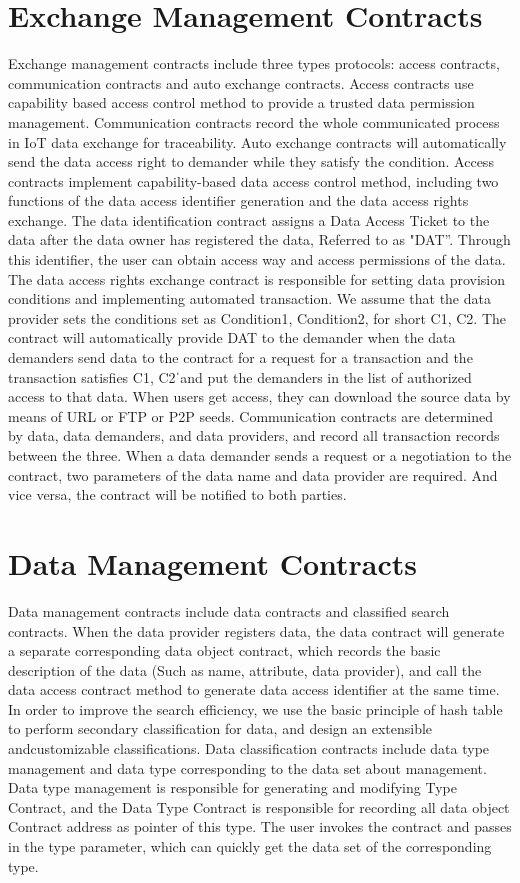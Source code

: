 \section{Exchange Management Contracts}
Exchange management contracts include three types
protocols: access contracts, communication contracts and
auto exchange contracts. Access contracts use capability
based access control method to provide a trusted data
permission management. Communication contracts record
the whole communicated process in IoT data exchange for
traceability. Auto exchange contracts will automatically send
the data access right to demander while they satisfy the
condition.
Access contracts implement capability-based data access
control method, including two functions of the data access
identifier generation and the data access rights exchange.
The data identification contract assigns a Data Access Ticket
to the data after the data owner has registered the data,
Referred to as "DAT”. Through this identifier, the user can
obtain access way and access permissions of the data. The
data access rights exchange contract is responsible for setting
data provision conditions and implementing automated
transaction. We assume that the data provider sets the
conditions set as Condition1, Condition2, for short C1, C2.
The contract will automatically provide DAT to the
demander when the data demanders send data to the contract
for a request for a transaction and the transaction satisfies C1, C2ˈand put the demanders in the list of authorized access to
that data. When users get access, they can download the
source data by means of URL or FTP or P2P seeds.
Communication contracts are determined by data, data
demanders, and data providers, and record all transaction
records between the three. When a data demander sends a
request or a negotiation to the contract, two parameters of the
data name and data provider are required. And vice versa, the
contract will be notified to both parties.
\section{Data Management Contracts}
Data management contracts include data contracts and
classified search contracts. When the data provider registers
data, the data contract will generate a separate corresponding
data object contract, which records the basic description of
the data (Such as name, attribute, data provider), and call the
data access contract method to generate data access identifier
at the same time. In order to improve the search efficiency,
we use the basic principle of hash table to perform secondary
classification for data, and design an extensible andcustomizable classifications. Data classification contracts
include data type management and data type corresponding
to the data set about management. Data type management is
responsible for generating and modifying Type Contract, and
the Data Type Contract is responsible for recording all data
object Contract address as pointer of this type. The user
invokes the contract and passes in the type parameter, which
can quickly get the data set of the corresponding type.
